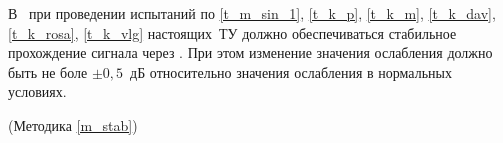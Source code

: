 В \dut \  при проведении испытаний по \ref{t_m_sin_1}, \ref{t_k_p}, \ref{t_k_m}, \ref{t_k_dav}, \ref{t_k_rosa}, \ref{t_k_vlg} настоящих~ТУ должно обеспечиваться стабильное прохождение сигнала через \dut. При этом изменение значения ослабления должно быть не боле $\pm 0,5$~дБ относительно значения ослабления в нормальных условиях.

\begin{flushright}
	(Методика \ref{m_stab})
\end{flushright}